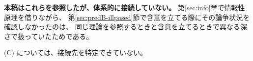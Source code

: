 \textbf{本稿はこれらを参照したが、体系的に接続していない。}
第\ref{sec:info}章で情報性原理を借りながら、
第\ref{sec:predB-illposed}節で含意を立てる際にその論争状況を確認しなかったのは、
同じ理論を参照するときと含意を立てるときで異なる深さで扱っていたためである。

(C) については、接続先を特定できていない。

